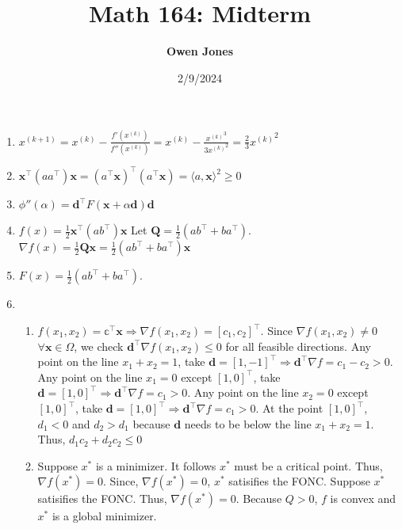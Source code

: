 \documentclass[10pt]{article}
\title{\bf Math 164: Midterm}
\date{2/9/2024}
\author{\bf Owen Jones}
\begin{document}
\maketitle
\begin{enumerate}
    \item $x^{(k+1)}=x^{(k)}-\frac{f'(x^{(k)})}{f''(x^{(k)})}=x^{(k)}-\frac{{x^{(k)}}^3}{3{x^{(k)}}^2}=\frac{2}{3}{x^{(k)}}^2$
    \item $\mathbf{x}^\top(aa^\top)\mathbf{x}={(a^\top \mathbf{x})}^\top (a^\top \mathbf{x})={\langle a,\mathbf{x}\rangle}^2\ge 0$
    \item $\phi''(\alpha)=\mathbf{d}^\top F(\mathbf{x}+\alpha\mathbf{d})\mathbf{d}$
    \item $f(x)=\frac{1}{2}\mathbf{x}^\top(ab^\top)\mathbf{x}$ Let $\mathbf{Q}=\frac{1}{2}(ab^\top+ba^\top)$. $\nabla f(x)=\frac{1}{2}\mathbf{Q}\mathbf{x}=\frac{1}{2}(ab^\top+ba^\top)\mathbf{x}$
    \item $F(x)=\frac{1}{2}(ab^\top+ba^\top)$.
    \item \begin{enumerate}
        \item $f(x_1,x_2)=\mathbb{c}^\top \mathbf{x}\Rightarrow\nabla f(x_1,x_2)={[c_1,c_2]}^\top$. 
        Since $\nabla f(x_1,x_2)\neq0$ $\forall \mathbf{x}\in\Omega$, we check $\mathbf{d}^\top\nabla f(x_1,x_2)\le 0$ for all feasible directions. 
        Any point on the line $x_1+x_2=1$, take $\mathbf{d}={[1,-1]}^\top\Rightarrow \mathbf{d}^\top\nabla f=c_1-c_2>0$.
        Any point on the line $x_1=0$  except ${[1,0]}^\top$, take $\mathbf{d}={[1,0]}^\top\Rightarrow \mathbf{d}^\top\nabla f=c_1>0$.
        Any point on the line $x_2=0$ except ${[1,0]}^\top$, take $\mathbf{d}={[1,0]}^\top\Rightarrow \mathbf{d}^\top\nabla f=c_1>0$.
        At the point ${[1,0]}^\top$, $d_1<0$ and $d_2>d_1$ because $\mathbf{d}$ needs to be below the line $x_1+x_2=1$. Thus, $d_1c_2+d_2c_2\le 0$
        \item Suppose $x^*$ is a minimizer. 
        It follows $x^*$ must be a critical point.
        Thus, $\nabla f(x^*)=0$. Since, $\nabla f(x^*)=0$, $x^*$ satisifies the FONC.
        Suppose $x^*$ satisifies the FONC.
        Thus, $\nabla f(x^*)=0$.
        Because $Q>0$, $f$ is convex and $x^*$ is a global minimizer.

\end{enumerate}
\end{enumerate}
\end{document}
